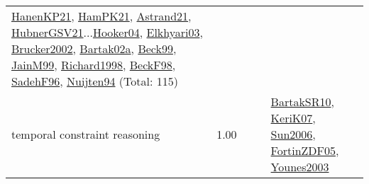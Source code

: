 {\begin{longtable}{p{3cm}r>{\raggedright\arraybackslash}p{6cm}>{\raggedright\arraybackslash}p{6cm}>{\raggedright\arraybackslash}p{8cm}}
\hyperref[detail:HanenKP21]{HanenKP21}, \hyperref[detail:HamPK21]{HamPK21}, \hyperref[detail:Astrand21]{Astrand21}, \hyperref[detail:HubnerGSV21]{HubnerGSV21}...\hyperref[detail:Hooker04]{Hooker04}, \hyperref[detail:Elkhyari03]{Elkhyari03}, \hyperref[detail:Brucker2002]{Brucker2002}, \hyperref[detail:Bartak02a]{Bartak02a}, \hyperref[detail:Beck99]{Beck99}, \hyperref[detail:JainM99]{JainM99}, \hyperref[detail:Richard1998]{Richard1998}, \hyperref[detail:BeckF98]{BeckF98}, \hyperref[detail:SadehF96]{SadehF96}, \hyperref[detail:Nuijten94]{Nuijten94} (Total: 115)\\
\index{temporal constraint reasoning}\index{Concepts!temporal constraint reasoning}temporal constraint reasoning &  1.00 &  &  & \hyperref[detail:BartakSR10]{BartakSR10}, \hyperref[detail:KeriK07]{KeriK07}, \hyperref[detail:Sun2006]{Sun2006}, \hyperref[detail:FortinZDF05]{FortinZDF05}, \hyperref[detail:Younes2003]{Younes2003}\\

\end{longtable}}
